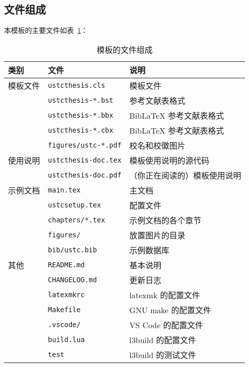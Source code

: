\documentclass[a4paper]{ltxdoc}
\DeclareRobustCommand\file{\nolinkurl}
\begin{document}
\subsection{文件组成}
本模板的主要文件如表~\ref{tab:files}：
\begin{table}[htb]
  \centering\small
  \caption{模板的文件组成}
  \label{tab:files}
  \begin{tabular}{lll}
    \toprule
    类别     & 文件                      & 说明                         \\
    \midrule
    模板文件 & \file{ustcthesis.cls}     & 模板文件                     \\
             & \file{ustcthesis-*.bst}   & \BibTeX{} 参考文献表格式     \\
             & \file{ustcthesis-*.bbx}   & BibLaTeX 参考文献表格式      \\
             & \file{ustcthesis-*.cbx}   & BibLaTeX 参考文献表格式      \\
             & \file{figures/ustc-*.pdf} & 校名和校徽图片               \\
    \midrule
    使用说明 & \file{ustcthesis-doc.tex} & 模板使用说明的源代码         \\
             & \file{ustcthesis-doc.pdf} & （你正在阅读的）模板使用说明 \\
    \midrule
    示例文档 & \file{main.tex}           & 主文档                       \\
             & \file{ustcsetup.tex}      & 配置文件                     \\
             & \file{chapters/*.tex}     & 示例文档的各个章节           \\
             & \file{figures/}           & 放置图片的目录               \\
             & \file{bib/ustc.bib}       & \BibTeX{} 示例数据库         \\
    \midrule
    其他     & \file{README.md}          & 基本说明                     \\
             & \file{CHANGELOG.md}       & 更新日志                     \\
             & \file{latexmkrc}          & latexmk 的配置文件           \\
             & \file{Makefile}           & GNU make 的配置文件          \\
             & \file{.vscode/}           & VS Code 的配置文件           \\
             & \file{build.lua}          & l3build 的配置文件           \\
             & \file{test}               & l3build 的测试文件           \\
    \bottomrule
  \end{tabular}
\end{table}
\end{document}

